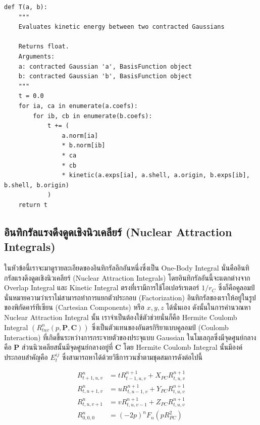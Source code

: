 \begin{lstlisting}[style=MyPython]
def T(a, b):
    """
    Evaluates kinetic energy between two contracted Gaussians

    Returns float.
    Arguments:
    a: contracted Gaussian 'a', BasisFunction object
    b: contracted Gaussian 'b', BasisFunction object
    """
    t = 0.0
    for ia, ca in enumerate(a.coefs):
        for ib, cb in enumerate(b.coefs):
            t += (
                a.norm[ia]
                * b.norm[ib]
                * ca
                * cb
                * kinetic(a.exps[ia], a.shell, a.origin, b.exps[ib], b.shell, b.origin)
            )
    return t
\end{lstlisting}

\subsection{อินทิกรัลแรงดึงดูดเชิงนิวเคลียร์ (Nuclear Attraction Integrals)}

ในหัวข้อนี้เราจะมาดูรายละเอียดของอินทิกรัลอีกอันหนึ่งซึ่งเป็น One-Body Integral นั่นคืออินทิกรัลแรงดึงดูดเชิงนิวเคลียร์ (Nuclear Attraction
Integrals) โดยอินทิกรัลอันนี้จะแตกต่างจาก Overlap Integral และ Kinetic Integral ตรงที่เรามีการใช้โอเปอร์เรเตอร์ $1/r_C$
ซึ่งก็คือคูลอมป์ นั่นหมายความว่าเราไม่สามารถทำการแยกตัวประกอบ (Factorization) อินทิกรัลของเราให้อยู่ในรูปของพิกัดคาร์ทีเซียน (Cartesian
Components) หรือ $x,y,z$ ได้นั่นเอง ดังนั้นในการคำนวณหา Nuclear Attraction Integral นั้น เราจำเป็นต้องใช้ตัวช่วยนั่นก็คือ
Hermite Coulomb Integral $(R^n_{tuv}(p,\mathbf{P},\mathbf{C}))$ ซึ่งเป็นตัวแทนของอันตรกิริยาแบบคูลอมป์ (Coulomb Interaction)
ที่เกิดขึ้นระหว่างการกระจายตัวของประจุแบบ Gaussian ในโมเลกุลซึ่งมีจุดศูนย์กลางคือ $\mathbf{P}$ ส่วนนิวเคลียสนั้นมีจุดศูนย์กลางอยู่ที่ $\mathbf{C}$
โดย Hermite Coulomb Integral นั้นมีองค์ประกอบสำคัญคือ $E_t^{ij}$ ซึ่งสามารถหาได้ด้วยวิธีการวนซ้ำตามชุดสมการดังต่อไปนี้

\begin{align}
  R^{n}_{t+1,u,v} & = t R^{n+1}_{t-1,u,v} + X_{PC}R^{n+1}_{t,u,v} \\
  R^{n}_{t,u+1,v} & = u R^{n+1}_{t,u-1,v} + Y_{PC}R^{n+1}_{t,u,v} \\
  R^{n}_{t,u,v+1} & = v R^{n+1}_{t,u,v-1} + Z_{PC}R^{n+1}_{t,u,v} \\
  R^{n}_{0,0,0}   & = (-2p)^n F_n (p R_{PC}^2)
\end{align}

